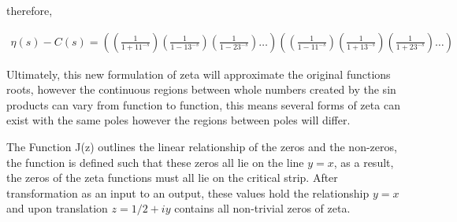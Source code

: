 \documentclass{article}
\begin{document}
therefore,

\begin{align*}
\eta(s) - C(s) =((\frac{1}{1 + 11^{-s}})(\frac{1}{1 - 13^{-s}})(\frac{1}{1 - 23^{-s}}) \ldots)((\frac{1}{1 - 11^{-s}})(\frac{1}{1 + 13^{-s}})(\frac{1}{1 + 23^{-s}}) \ldots)
\end{align*}

Ultimately, this new formulation of zeta will approximate the original functions roots, however the continuous regions between whole numbers created by the sin products can vary from function to function, this means several forms of zeta can exist with the same poles however the regions between poles will differ.

The Function J(z) outlines the linear relationship of the zeros and the non-zeros, the function is defined such that these zeros all lie on the line $y = x$, as a result, the zeros of the zeta functions must all lie on the critical strip. After transformation as an input to an output, these values hold the relationship $y=x$ and upon translation $z = 1/2 + iy$ contains all non-trivial zeros of zeta.
\newpage
\nocite{*}
\printbibliography
\end{document}
